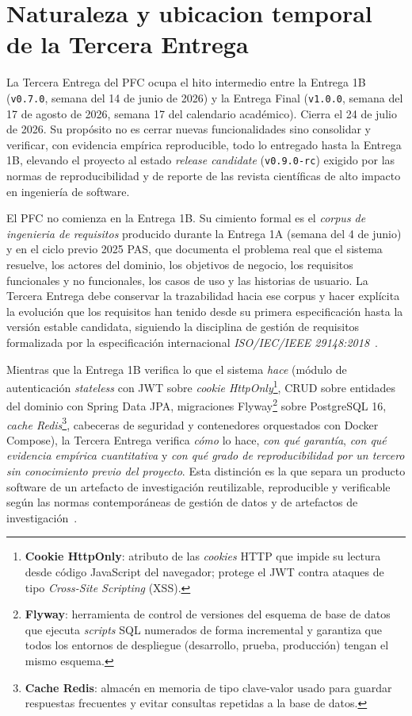 \documentclass[11pt,a4paper]{article}
\begin{document}
\section{Naturaleza y ubicacion temporal de la Tercera Entrega}

La Tercera Entrega del PFC ocupa el hito intermedio entre la Entrega 1B (\texttt{v0.7.0}, semana del 14 de junio de 2026) y la Entrega Final (\texttt{v1.0.0}, semana del 17 de agosto de 2026, semana 17 del calendario acad\'{e}mico). Cierra el 24 de julio de 2026. Su prop\'{o}sito no es cerrar nuevas funcionalidades sino consolidar y verificar, con evidencia emp\'{i}rica reproducible, todo lo entregado hasta la Entrega 1B, elevando el proyecto al estado \emph{release candidate} (\texttt{v0.9.0-rc}) exigido por las normas de reproducibilidad y de reporte de las revista cient\'{i}ficas de alto impacto en ingenier\'{i}a de software.

El PFC no comienza en la Entrega 1B. Su cimiento formal es el \emph{corpus de ingenieria de requisitos} producido durante la Entrega 1A (semana del 4 de junio) y en el ciclo previo 2025 PAS, que documenta el problema real que el sistema resuelve, los actores del dominio, los objetivos de negocio, los requisitos funcionales y no funcionales, los casos de uso y las historias de usuario. La Tercera Entrega debe conservar la trazabilidad hacia ese corpus y hacer expl\'{i}cita la evoluci\'{o}n que los requisitos han tenido desde su primera especificaci\'{o}n hasta la versi\'{o}n estable candidata, siguiendo la disciplina de gesti\'{o}n de requisitos formalizada por la especificaci\'{o}n internacional \emph{ISO/IEC/IEEE 29148:2018}~\cite{iso29148,pohl2010requirements,wiegers2013software}.

Mientras que la Entrega 1B verifica lo que el sistema \emph{hace} (m\'{o}dulo de autenticaci\'{o}n \emph{stateless} con JWT sobre \emph{cookie HttpOnly}\footnote{\textbf{Cookie HttpOnly}: atributo de las \emph{cookies} HTTP que impide su lectura desde c\'{o}digo JavaScript del navegador; protege el JWT contra ataques de tipo \emph{Cross-Site Scripting} (XSS).}, CRUD sobre entidades del dominio con Spring Data JPA, migraciones Flyway\footnote{\textbf{Flyway}: herramienta de control de versiones del esquema de base de datos que ejecuta \emph{scripts} SQL numerados de forma incremental y garantiza que todos los entornos de despliegue (desarrollo, prueba, producci\'{o}n) tengan el mismo esquema.} sobre PostgreSQL 16, \emph{cache Redis}\footnote{\textbf{Cache Redis}: almac\'{e}n en memoria de tipo clave-valor usado para guardar respuestas frecuentes y evitar consultas repetidas a la base de datos.}, cabeceras de seguridad y contenedores orquestados con Docker Compose), la Tercera Entrega verifica \emph{c\'{o}mo} lo hace, \emph{con qu\'{e} garant\'{i}a}, \emph{con qu\'{e} evidencia emp\'{i}rica cuantitativa} y \emph{con qu\'{e} grado de reproducibilidad por un tercero sin conocimiento previo del proyecto}. Esta distinci\'{o}n es la que separa un producto software de un artefacto de investigaci\'{o}n reutilizable, reproducible y verificable seg\'{u}n las normas contempor\'{a}neas de gesti\'{o}n de datos y de artefactos de investigaci\'{o}n~\cite{wilkinson2016fair,acm2020artifact,ralph2021empirical}.
\end{document}
